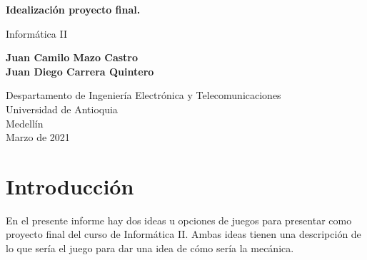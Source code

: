\documentclass{article}
\begin{document}
\begin{titlepage}
    \begin{center}
        \vspace*{1cm}
            
        \Huge
        \textbf{Idealización proyecto final.}
            
        \vspace{0.5cm}
        \LARGE
        Informática II
            
        \vspace{1.5cm}
            
        \textbf{Juan Camilo Mazo Castro\\
        Juan Diego Carrera Quintero}
            
        \vfill
            
        \vspace{0.8cm}
            
        \Large
        Despartamento de Ingeniería Electrónica y Telecomunicaciones\\
        Universidad de Antioquia\\
        Medellín\\
        Marzo de 2021
            
    \end{center}
\end{titlepage}

\tableofcontents
\newpage
\section{Introducción}\label{intro}
En el presente informe hay dos ideas u opciones de juegos para presentar como proyecto final del curso de Informática II. Ambas ideas tienen una descripción de lo que sería el juego para dar una idea de cómo sería la mecánica.
\end{document}
